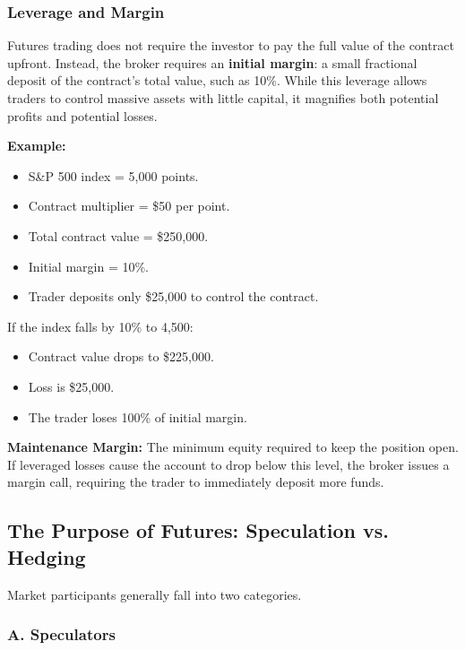 \documentclass[12pt,openany]{book}
\begin{document}
\subsubsection{Leverage and Margin}

Futures trading does not require the investor to pay the full value of the contract upfront. Instead, the broker requires an \textbf{initial margin}: a small fractional deposit of the contract's total value, such as 10\%. While this leverage allows traders to control massive assets with little capital, it magnifies both potential profits and potential losses.

\textbf{Example:}

\begin{itemize}[leftmargin=*]
    \item S\&P 500 index = 5,000 points.
    \item Contract multiplier = \$50 per point.
    \item Total contract value = \$250,000.
    \item Initial margin = 10\%.
    \item Trader deposits only \$25,000 to control the contract.
\end{itemize}

If the index falls by 10\% to 4,500:

\begin{itemize}[leftmargin=*]
    \item Contract value drops to \$225,000.
    \item Loss is \$25,000.
    \item The trader loses 100\% of initial margin.
\end{itemize}

\textbf{Maintenance Margin:} The minimum equity required to keep the position open. If leveraged losses cause the account to drop below this level, the broker issues a margin call, requiring the trader to immediately deposit more funds.

\subsection{The Purpose of Futures: Speculation vs. Hedging}

Market participants generally fall into two categories.

\subsubsection{A. Speculators}
\end{document}
